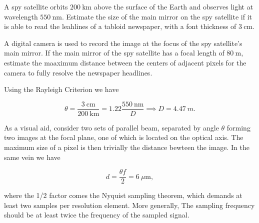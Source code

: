 \documentclass[english,a4paper,12pt]{report}
\begin{document}
{A spy satellite orbits \(\SI{200}{\km} \) above the surface of the Earth and observes light at wavelength \(\SI{550}{\nm} \). Estimate the size of the main mirror on the spy satellite if it is able to read the leahlines of a tabloid newspaper, with a font thickness of \(\SI{3}{\cm} \). 

A digital camera is used to record the image at the focus of the spy satellite's main mirror. If the main mirror of the spy satellite has a focal length of \(\SI{80}{\m} \), estimate the maaximum distance between the centers of adjacent pixels for the camera to fully resolve the newspaper headlines.}
{Using the Rayleigh Criterion we have

\begin{equation}
    \theta = \frac{\SI{3}{\cm} }{\SI{200}{\km} } = 1.22 \frac{\SI{550}{\nano \m} }{D} \implies D = \SI{4.47}{m}.
\end{equation}

As a visual aid, consider two sets of parallel beam, separated by angle \(\theta \) forming two images at the focal plane, one of which is located on the optical axis. The maximum size of a pixel is then trivially the distance bewteen the image. In the same vein we have 

\begin{equation}
    d = \frac{\theta f}{2} = \SI{6}{\mu \m},  
\end{equation}

where the 1/2 factor comes the Nyquist sampling theorem, which demands at least two samples per resolution element. More generally, The sampling frequency should be at least twice the frequency of the sampled signal.
} 
\end{document}
